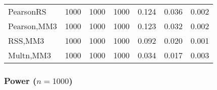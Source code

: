 \documentclass[
]{article}
\begin{document}
\begin{table}[H]
{\begin{tabular}[t]{lrrrrrr}
\hspace{1em}PearsonRS & 1000 & 1000 & 1000 & 0.124 & 0.036 & 0.002\\
\hspace{1em}Pearson,MM3 & 1000 & 1000 & 1000 & 0.123 & 0.032 & 0.002\\
\hspace{1em}RSS,MM3 & 1000 & 1000 & 1000 & 0.092 & 0.020 & 0.001\\
\hspace{1em}Multn,MM3 & 1000 & 1000 & 1000 & 0.034 & 0.017 & 0.003\\
\bottomrule
\end{tabular}}
\end{table}

\hypertarget{power-n1000-3}{%
\subsubsection{\texorpdfstring{Power
(\(n=1000\))}{Power (n=1000)}}\label{power-n1000-3}}
\end{document}
